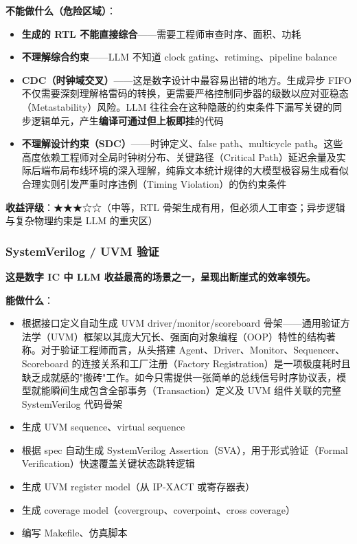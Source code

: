\documentclass[UTF8,a4paper,10pt,oneside]{ctexart}
\begin{document}
\textbf{不能做什么（危险区域）}：
\begin{itemize}
    \item \textbf{生成的 RTL 不能直接综合}——需要工程师审查时序、面积、功耗
    \item \textbf{不理解综合约束}——LLM 不知道 clock gating、retiming、pipeline balance
    \item \textbf{CDC（时钟域交叉）}——这是数字设计中最容易出错的地方。生成异步 FIFO 不仅需要深刻理解格雷码的转换，更需要严格控制同步器的级数以应对亚稳态（Metastability）风险。LLM 往往会在这种隐蔽的约束条件下漏写关键的同步逻辑单元，产生\textbf{编译可通过但上板即挂}的代码
    \item \textbf{不理解设计约束（SDC）}——时钟定义、false path、multicycle path。这些高度依赖工程师对全局时钟树分布、关键路径（Critical Path）延迟余量及实际后端布局布线环境的深入理解，纯靠文本统计规律的大模型极容易生成看似合理实则引发严重时序违例（Timing Violation）的伪约束条件
\end{itemize}

\textbf{收益评级}：★★★☆☆（中等，RTL 骨架生成有用，但必须人工审查；异步逻辑与复杂物理约束是 LLM 的重灾区）

\subsubsection{SystemVerilog / UVM 验证}

\textbf{这是数字 IC 中 LLM 收益最高的场景之一，呈现出断崖式的效率领先。}

\textbf{能做什么}：
\begin{itemize}
    \item 根据接口定义自动生成 UVM driver/monitor/scoreboard 骨架——通用验证方法学（UVM）框架以其庞大冗长、强面向对象编程（OOP）特性的结构著称。对于验证工程师而言，从头搭建 Agent、Driver、Monitor、Sequencer、Scoreboard 的连接关系和工厂注册（Factory Registration）是一项极度耗时且缺乏成就感的"搬砖"工作。如今只需提供一张简单的总线信号时序协议表，模型就能瞬间生成包含全部事务（Transaction）定义及 UVM 组件关联的完整 SystemVerilog 代码骨架
    \item 生成 UVM sequence、virtual sequence
    \item 根据 spec 自动生成 SystemVerilog Assertion（SVA），用于形式验证（Formal Verification）快速覆盖关键状态跳转逻辑
    \item 生成 UVM register model（从 IP-XACT 或寄存器表）
    \item 生成 coverage model（covergroup、coverpoint、cross coverage）
    \item 编写 Makefile、仿真脚本
\end{itemize}
\end{document}
